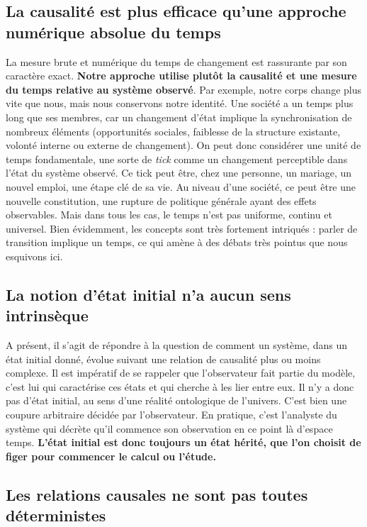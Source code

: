 \documentclass[11pt]{article}
\begin{document}
	
	\subsection{La causalité est plus efficace qu'une approche numérique absolue du temps}
	
	La mesure brute et numérique du temps de changement est rassurante par son caractère exact. \textbf{Notre approche utilise plutôt la causalité et une mesure du temps relative au système observé}. Par exemple, notre corps change plus vite que nous, mais nous conservons notre identité. Une société a un temps plus long que ses membres, car un changement d'état implique la synchronisation de nombreux éléments (opportunités sociales, faiblesse de la structure existante, volonté interne ou externe de changement). On peut donc considérer une unité de temps fondamentale, une sorte de \textit{tick} comme un changement perceptible dans l'état du système observé. Ce tick peut être, chez une personne, un mariage, un nouvel emploi, une étape clé de sa vie. Au niveau d'une société, ce peut être une nouvelle constitution, une rupture de politique générale ayant des effets observables. Mais dans tous les cas, le temps n'est pas uniforme, continu et universel. Bien évidemment, les concepts sont très fortement intriqués : parler de transition implique un temps, ce qui amène à des débats très pointus que nous esquivons ici. 
	
	\subsection{La notion d'état initial n'a aucun sens intrinsèque}	
	
	A présent, il s'agit de répondre à la question de comment un système, dans un état initial donné, évolue suivant une relation de causalité plus ou moins complexe. Il est impératif de se rappeler que l'observateur fait partie du modèle, c'est lui qui caractérise ces états et qui cherche à les lier entre eux. Il n'y a donc pas d'état initial, au sens d'une réalité ontologique de l'univers. C'est bien une coupure arbitraire décidée par l'observateur. En pratique, c'est l'analyste du système qui décrète qu'il commence son observation en ce point là d'espace temps. \textbf{L'état initial est donc toujours un état hérité, que l'on choisit de figer pour commencer le calcul ou l'étude.} 
	
	
	
	\subsection{Les relations causales ne sont pas toutes déterministes}
	
\end{document}
